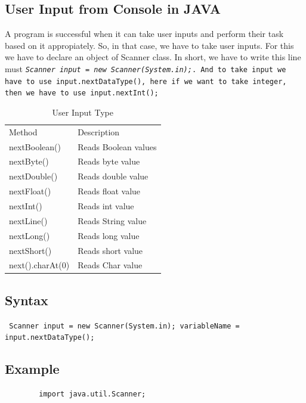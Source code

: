 \documentclass[openany]{book}  %
\begin{document}
\begin{flushleft}
    \section{User Input from Console in JAVA}
    A program is successful when it can take user inputs\cite{Ref7} and perform their task based on it appropiately.
    So, in that case, we have to take user inputs. For this we have to declare an object of Scanner class.
    In short, we have to write this line must \tt{\textit{Scanner input = new Scanner(System.in);}}.
    And to take input we have to use input.nextDataType(), here if we want to take integer, then we have to use input.nextInt();
    \begin{table}[htbp]
        \begin{tabular}{ll}
            Method           & Description          \\
            nextBoolean()    & Reads Boolean values \\
            nextByte()       & Reads byte value     \\
            nextDouble()     & Reads double value   \\
            nextFloat()      & Reads float value    \\
            nextInt()        & Reads int value      \\
            nextLine()       & Reads String value   \\
            nextLong()       & Reads long value     \\
            nextShort()      & Reads short value    \\
            next().charAt(0) & Reads Char value
        \end{tabular}
        \centering
        \caption{User Input Type}
    \end{table}
    \subsection{Syntax}
    \begin{center}
        \tt{
            Scanner input = new Scanner(System.in);
            variableName = input.nextDataType();
        }
    \end{center}
    \subsection{Example}
    \begin{center}
        \begin{verbatim}
        import java.util.Scanner;


\end{verbatim}
\end{center}
\end{flushleft}
\end{document}
